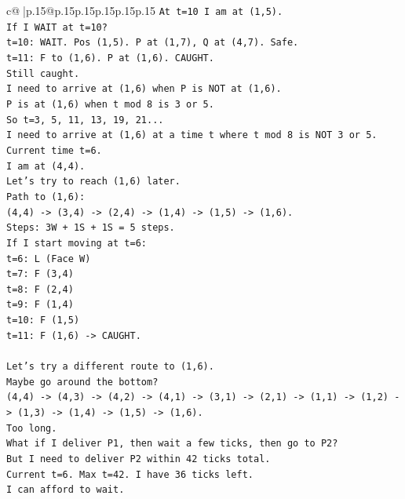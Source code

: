 \documentclass{article}
\begin{document}
{\begin{supertabular}{c@{$\;$}|p{.15\linewidth}@{}p{.15\linewidth}p{.15\linewidth}p{.15\linewidth}p{.15\linewidth}p{.15\linewidth}}
{{{\texttt{At t=10 I am at (1,5).} \\
\texttt{If I WAIT at t=10?} \\
\texttt{t=10: WAIT. Pos (1,5). P at (1,7), Q at (4,7). Safe.} \\
\texttt{t=11: F to (1,6). P at (1,6). CAUGHT.} \\
\texttt{Still caught.} \\
\texttt{I need to arrive at (1,6) when P is NOT at (1,6).} \\
\texttt{P is at (1,6) when t mod 8 is 3 or 5.} \\
\texttt{So t=3, 5, 11, 13, 19, 21...} \\
\texttt{I need to arrive at (1,6) at a time t where t mod 8 is NOT 3 or 5.} \\
\texttt{Current time t=6.} \\
\texttt{I am at (4,4).} \\
\texttt{Let's try to reach (1,6) later.} \\
\texttt{Path to (1,6):} \\
\texttt{(4,4) {-}> (3,4) {-}> (2,4) {-}> (1,4) {-}> (1,5) {-}> (1,6).} \\
\texttt{Steps: 3W + 1S + 1S = 5 steps.} \\
\texttt{If I start moving at t=6:} \\
\texttt{t=6: L (Face W)} \\
\texttt{t=7: F (3,4)} \\
\texttt{t=8: F (2,4)} \\
\texttt{t=9: F (1,4)} \\
\texttt{t=10: F (1,5)} \\
\texttt{t=11: F (1,6) {-}> CAUGHT.} \\
\\ 
\texttt{Let's try a different route to (1,6).} \\
\texttt{Maybe go around the bottom?} \\
\texttt{(4,4) {-}> (4,3) {-}> (4,2) {-}> (4,1) {-}> (3,1) {-}> (2,1) {-}> (1,1) {-}> (1,2) {-}> (1,3) {-}> (1,4) {-}> (1,5) {-}> (1,6).} \\
\texttt{Too long.} \\
\texttt{What if I deliver P1, then wait a few ticks, then go to P2?} \\
\texttt{But I need to deliver P2 within 42 ticks total.} \\
\texttt{Current t=6. Max t=42. I have 36 ticks left.} \\
\texttt{I can afford to wait.} \\
}}}
\end{supertabular}}
\end{document}
